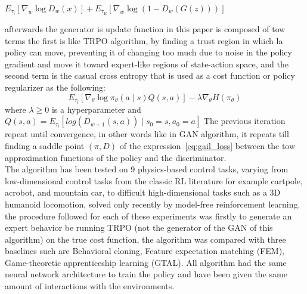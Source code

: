 \begin{center}
$E_{\tau_i}[\nabla_w\log{D_w(x)}] + E_{\tau_E}[\nabla_w\log{(1-D_w(G(z)))}]$
\end{center}
afterwards the generator is update function in this paper is composed of tow terms the first is like TRPO algorithm, by finding a trust region in which la policy can move, preventing it of changing too much due to noise in the policy gradient and move it toward expert-like regions of state-action space, and the second term is the casual cross entropy that is used as a cost function or policy regularizer as the following:
\begin{equation}
	E_{\tau_i}[\nabla_{\theta}\log{\pi_{\theta}(a \mid s)}Q(s,a)] - \lambda \nabla_{\theta} H(\pi_{\theta})
\label{eq:gail_loss}
\end{equation}
where $\lambda \geqslant 0$ is a hyperparameter and $Q(s,a) = E_{\tau_i}[log{(D_{w+1}(s,a))} \mid s_0=s,a_0 = a]$
The previous iteration repeat until convergence, in other words like in GAN algorithm, it repeats till finding a saddle point $(\pi, D)$ of the expression~\ref{eq:gail_loss} between the tow approximation functions of the policy and the discriminator.\\
The algorithm has been tested on 9 physics-based control tasks, varying from low-dimensional control tasks from the classic RL literature for example cartpole, acrobot, and mountain
car, to difficult high-dimensional tasks such as a 3D humanoid locomotion, solved only recently
by model-free reinforcement learning. the procedure followed for each of these experiments was firstly to generate an expert behavior be running TRPO (not the generator of the GAN of this algorithm) on the true cost function, the algorithm was compared with three baselines such are Behavioral cloning, Feature expectation matching (FEM), Game-theoretic apprenticeship learning (GTAL). All algorithm had the same neural network architecture to train the policy and have been given the same amount of interactions with the environments.

